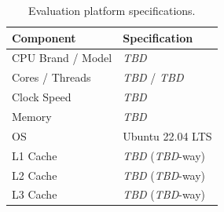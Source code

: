 \documentclass[sigconf, nonacm]{acmart}
\begin{document}
\begin{scriptsize}
\begin{table}[t]
\centering
\caption{Evaluation platform specifications.}
\begin{tabular}{@{}ll@{}}
\toprule
\textbf{Component} & \textbf{Specification} \\
\midrule
CPU Brand / Model & \emph{TBD} \\
Cores / Threads   & \emph{TBD} / \emph{TBD} \\
Clock Speed       & \emph{TBD} \\
Memory            & \emph{TBD} \\
OS                & Ubuntu 22.04 LTS \\
\midrule
L1 Cache          & \emph{TBD} (\emph{TBD}-way) \\
L2 Cache          & \emph{TBD} (\emph{TBD}-way) \\
L3 Cache          & \emph{TBD} (\emph{TBD}-way) \\
\bottomrule
\end{tabular}
\label{table:system}
\end{table}
\end{scriptsize}
\end{document}
